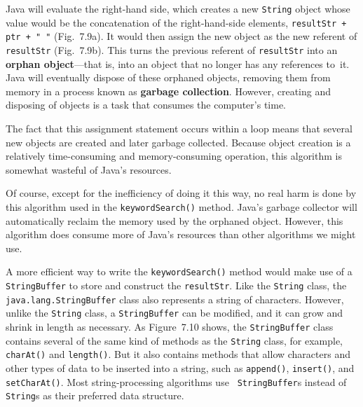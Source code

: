 \noindent Java will evaluate the right-hand side, which creates a new
{\tt String} object whose value would be the concatenation of the
right-hand-side elements, \verb|resultStr + ptr + " "|
(Fig.~7\mbox{.}9a). It would then assign the new object as the new
referent of {\tt resultStr} (Fig.~7.9b).  This turns the previous
referent of {\tt resultStr} into an {\bf orphan object}---that is,
into an object that no longer has any references to~it.  Java will
eventually dispose of these orphaned objects, removing them from
memory in a process known as {\bf garbage collection}.  However,
creating and disposing of objects is a task that consumes the
computer's time.

The fact that this assignment statement occurs within a loop means
that several new objects are created and later garbage collected.
Because object creation is a relatively time-consuming and
memory-consuming operation, this algorithm is somewhat wasteful of
Java's resources.  

Of course, except for the inefficiency of doing it this way, no real
harm is done by this algorithm used in the {\tt keywordSearch()}
method.  Java's garbage collector will automatically reclaim the
memory used by the orphaned object. However, this algorithm does
consume more of Java's resources than other algorithms we might use.


\noindent A more efficient way to write the {\tt keywordSearch()}
method would make use of a {\tt StringBuffer} to store and construct
the {\tt resultStr}.  Like the {\tt String} class, the {\tt
java.lang.StringBuffer} class also represents a string of characters.
However, unlike the {\tt String} class, a {\tt StringBuffer} can be
modified, and it can grow and shrink in length as
necessary.  As Figure~7.10 shows, the {\tt StringBuffer}
class contains several of the same kind of methods as the {\tt String}
class, for example, {\tt charAt()} and {\tt length()}. But it also
contains methods that allow characters and other types of data to be
inserted into a string, such as {\tt append()}, {\tt insert()}, and
{\tt setCharAt()}.  Most string-processing algorithms use {\tt
StringBuffer}s instead of {\tt String}s as their preferred data
structure.


